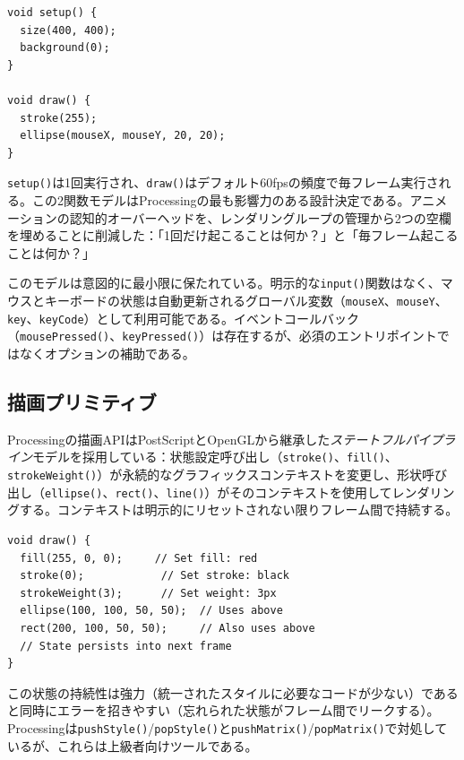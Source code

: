 \documentclass[10pt,letterpaper,twocolumn]{article}
\begin{document}
\begin{lstlisting}[style=processingstyle,caption={最小限のProcessingスケッチ。}]
void setup() {
  size(400, 400);
  background(0);
}

void draw() {
  stroke(255);
  ellipse(mouseX, mouseY, 20, 20);
}
\end{lstlisting}

\texttt{setup()}は1回実行され、\texttt{draw()}はデフォルト60fpsの頻度で毎フレーム実行される。この2関数モデルはProcessingの最も影響力のある設計決定である。アニメーションの認知的オーバーヘッドを、レンダリングループの管理から2つの空欄を埋めることに削減した：「1回だけ起こることは何か？」と「毎フレーム起こることは何か？」

このモデルは意図的に最小限に保たれている。明示的な\texttt{input()}関数はなく、マウスとキーボードの状態は自動更新されるグローバル変数（\texttt{mouseX}、\texttt{mouseY}、\texttt{key}、\texttt{keyCode}）として利用可能である。イベントコールバック（\texttt{mousePressed()}、\texttt{keyPressed()}）は存在するが、必須のエントリポイントではなくオプションの補助である。

\subsection{描画プリミティブ}

Processingの描画APIはPostScriptとOpenGLから継承した\emph{ステートフルパイプライン}モデルを採用している：状態設定呼び出し（\texttt{stroke()}、\texttt{fill()}、\texttt{strokeWeight()}）が永続的なグラフィックスコンテキストを変更し、形状呼び出し（\texttt{ellipse()}、\texttt{rect()}、\texttt{line()}）がそのコンテキストを使用してレンダリングする。コンテキストは明示的にリセットされない限りフレーム間で持続する。

\begin{lstlisting}[style=processingstyle,caption={ステートフル描画コンテキスト。}]
void draw() {
  fill(255, 0, 0);     // Set fill: red
  stroke(0);            // Set stroke: black
  strokeWeight(3);      // Set weight: 3px
  ellipse(100, 100, 50, 50);  // Uses above
  rect(200, 100, 50, 50);     // Also uses above
  // State persists into next frame
}
\end{lstlisting}

この状態の持続性は強力（統一されたスタイルに必要なコードが少ない）であると同時にエラーを招きやすい（忘れられた状態がフレーム間でリークする）。Processingは\texttt{pushStyle()}/\texttt{popStyle()}と\texttt{pushMatrix()}/\texttt{popMatrix()}で対処しているが、これらは上級者向けツールである。
\end{document}
